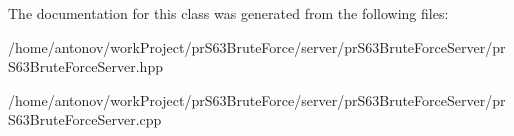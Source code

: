 The documentation for this class was generated from the following files\+:\begin{DoxyCompactItemize}
\item 
/home/antonov/work\+Project/pr\+S63\+Brute\+Force/server/pr\+S63\+Brute\+Force\+Server/pr\+S63\+Brute\+Force\+Server.\+hpp\item 
/home/antonov/work\+Project/pr\+S63\+Brute\+Force/server/pr\+S63\+Brute\+Force\+Server/pr\+S63\+Brute\+Force\+Server.\+cpp\end{DoxyCompactItemize}
